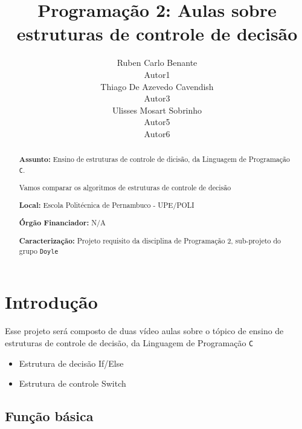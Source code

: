 \documentclass[a4paper,10pt]{article}  %
\title{ Programação 2: 
        Aulas sobre estruturas de controle de decisão}
\author{Ruben Carlo Benante \\ Autor1 \\ Thiago De Azevedo Cavendish \\ Autor3 \\ Ulisses Mosart Sobrinho \\ Autor5 \\ Autor6 }
\begin{document}

\maketitle


\begin{abstract}

\textbf{Assunto:} Ensino de estruturas de controle de dicisão, da Linguagem de Programação \texttt{C}.

 Vamos comparar os algoritmos de estruturas de controle de decisão %

\textbf{Local:} Escola Politécnica de Pernambuco - UPE/POLI

\textbf{Órgão Financiador:} N/A

\textbf{Caracterização:} Projeto requisito da disciplina de Programação 2, sub-projeto do grupo \texttt{Doyle}


\end{abstract}




\section{Introdução}


   Esse projeto será composto de duas vídeo aulas sobre o tópico de ensino de estruturas de controle de decisão,  da Linguagem de Programação \texttt{C}

\begin{itemize}

 \item Estrutura de decisão If/Else
 \item Estrutura de controle Switch
\end{itemize}


 \subsection{Função básica}
\end{document}
